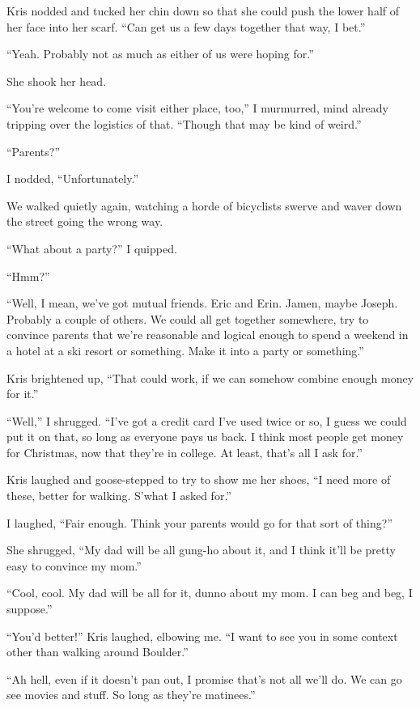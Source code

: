 Kris nodded and tucked her chin down so that she could push the lower half of her face into her scarf.  ``Can get us a few days together that way, I bet.''

``Yeah.  Probably not as much as either of us were hoping for.''

She shook her head.

``You're welcome to come visit either place, too,'' I murmurred, mind already tripping over the logistics of that.  ``Though that may be kind of weird.''

``Parents?''

I nodded, ``Unfortunately.''

We walked quietly again, watching a horde of bicyclists swerve and waver down the street going the wrong way.

``What about a party?'' I quipped.

``Hmm?''

``Well, I mean, we've got mutual friends.  Eric and Erin.  Jamen, maybe Joseph.  Probably a couple of others.  We could all get together somewhere, try to convince parents that we're reasonable and logical enough to spend a weekend in a hotel at a ski resort or something.  Make it into a party or something.''

Kris brightened up, ``That could work, if we can somehow combine enough money for it.''

``Well,'' I shrugged.  ``I've got a credit card I've used twice or so, I guess we could put it on that, so long as everyone pays us back.  I think most people get money for Christmas, now that they're in college.  At least, that's all I ask for.''

Kris laughed and goose-stepped to try to show me her shoes, ``I need more of these, better for walking.  S'what I asked for.''

I laughed, ``Fair enough.  Think your parents would go for that sort of thing?''

She shrugged, ``My dad will be all gung-ho about it, and I think it'll be pretty easy to convince my mom.''

``Cool, cool.  My dad will be all for it, dunno about my mom.  I can beg and beg, I suppose.''

``You'd better!'' Kris laughed, elbowing me.  ``I want to see you in some context other than walking around Boulder.''

``Ah hell, even if it doesn't pan out, I promise that's not all we'll do.  We can go see movies and stuff.  So long as they're matinees.''

